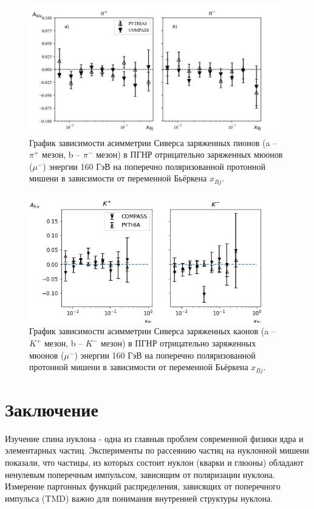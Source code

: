 \documentclass{extreport}
\begin{document}
\begin{figure}[h!]
	\centering
	\includegraphics[width=\linewidth]{pion.jpg}
	\caption{График зависимости асимметрии Сиверса заряженных пионов (a -- $\pi^+$ мезон, b -- $\pi^-$ мезон) в ПГНР отрицательно заряженных мюонов ($\mu^-$) энергии 160 ГэВ на поперечно поляризованной протонной мишени в зависимости от переменной Бьёркена $x_{Bj}$. }
	\label{fig:pions}
\end{figure}

\begin{figure}[h!]
	\centering
	\includegraphics[width=\linewidth]{ASivK.png}
	\caption{График зависимости асимметрии Сиверса заряженных каонов (a -- $K^+$ мезон, b -- $K^-$ мезон) в ПГНР отрицательно заряженных мюонов ($\mu^-$) энергии 160 ГэВ на поперечно поляризованной протонной мишени в зависимости от переменной Бьёркена $x_{Bj}$. }
	\label{fig:pions}
\end{figure}

\newpage
\chapter*{Заключение}
\thispagestyle{headings}
Изучение спина нуклона - одна из главныв проблем современной физики ядра и элементарных частиц. Эксперименты по рассеянию частиц на нуклонной мишени показали, что частицы, из которых состоит нуклон (кварки и глюоны) обладают ненулевым поперечным импульсом, зависящим от поляризации нуклона. Измерение партонных функций распределения, зависящих от поперечного импульса (TMD) важно для понимания внутренней структуры нуклона.
\end{document}
